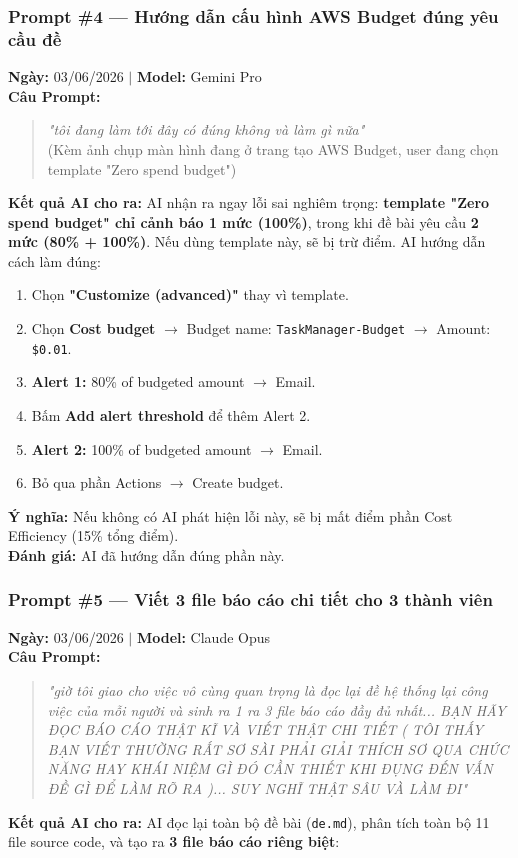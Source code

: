 \documentclass[13pt]{article}
\begin{document}
\subsubsection{Prompt \#4 — Hướng dẫn cấu hình AWS Budget đúng yêu cầu đề}
\textbf{Ngày:} 03/06/2026 $|$ \textbf{Model:} Gemini Pro\\
\textbf{Câu Prompt:}
\begin{quote}
\textit{"tôi đang làm tới đây có đúng không và làm gì nữa"}\\
(Kèm ảnh chụp màn hình đang ở trang tạo AWS Budget, user đang chọn template "Zero spend budget")
\end{quote}
\textbf{Kết quả AI cho ra:}
AI nhận ra ngay lỗi sai nghiêm trọng: \textbf{template "Zero spend budget" chỉ cảnh báo 1 mức (100\%)}, trong khi đề bài yêu cầu \textbf{2 mức (80\% + 100\%)}. Nếu dùng template này, sẽ bị trừ điểm.
AI hướng dẫn cách làm đúng:
\begin{enumerate}
    \item Chọn \textbf{"Customize (advanced)"} thay vì template.
    \item Chọn \textbf{Cost budget} $\rightarrow$ Budget name: \texttt{TaskManager-Budget} $\rightarrow$ Amount: \texttt{\$0.01}.
    \item \textbf{Alert 1:} 80\% of budgeted amount $\rightarrow$ Email.
    \item Bấm \textbf{Add alert threshold} để thêm Alert 2.
    \item \textbf{Alert 2:} 100\% of budgeted amount $\rightarrow$ Email.
    \item Bỏ qua phần Actions $\rightarrow$ Create budget.
\end{enumerate}
\textbf{Ý nghĩa:} Nếu không có AI phát hiện lỗi này, sẽ bị mất điểm phần Cost Efficiency (15\% tổng điểm).\\
\textbf{Đánh giá:} AI đã hướng dẫn đúng phần này.

\subsubsection{Prompt \#5 — Viết 3 file báo cáo chi tiết cho 3 thành viên}
\textbf{Ngày:} 03/06/2026 $|$ \textbf{Model:} Claude Opus\\
\textbf{Câu Prompt:}
\begin{quote}
\textit{"giờ tôi giao cho việc vô cùng quan trọng là đọc lại đề hệ thống lại công việc của mỗi người và sinh ra 1 ra 3 file báo cáo đầy đủ nhất... BẠN HÃY ĐỌC BÁO CÁO THẬT KĨ VÀ VIẾT THẬT CHI TIẾT ( TÔI THẤY BẠN VIẾT THƯỜNG RẤT SƠ SÀI PHẢI GIẢI THÍCH SƠ QUA CHỨC NĂNG HAY KHÁI NIỆM GÌ ĐÓ CẦN THIẾT KHI ĐỤNG ĐẾN VẤN ĐỀ GÌ ĐỂ LÀM RÕ RA )... SUY NGHĨ THẬT SÂU VÀ LÀM ĐI"}
\end{quote}
\textbf{Kết quả AI cho ra:}
AI đọc lại toàn bộ đề bài (\texttt{de.md}), phân tích toàn bộ 11 file source code, và tạo ra \textbf{3 file báo cáo riêng biệt}:
\end{document}
